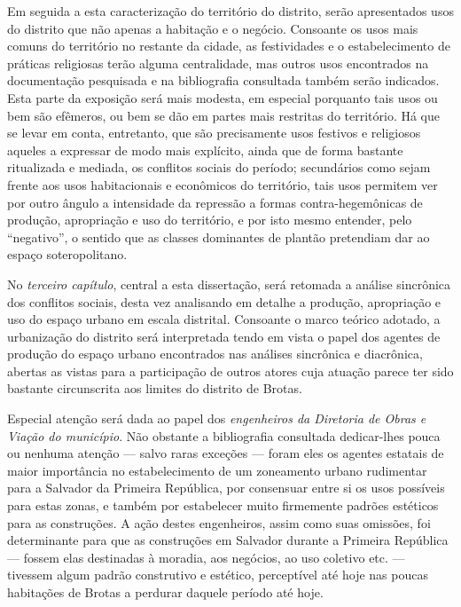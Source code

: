 Em seguida a esta caracterização do território do distrito, serão apresentados usos do distrito que não apenas a habitação e o negócio. Consoante os usos mais comuns do território no restante da cidade, as festividades e o estabelecimento de práticas religiosas terão alguma centralidade, mas outros usos encontrados na documentação pesquisada e na bibliografia consultada também serão indicados. Esta parte da exposição será mais modesta, em especial porquanto tais usos ou bem são efêmeros, ou bem se dão em partes mais restritas do território. Há que se levar em conta, entretanto, que são precisamente usos festivos e religiosos aqueles a expressar de modo mais explícito, ainda que de forma bastante ritualizada e mediada, os conflitos sociais do período; secundários como sejam frente aos usos habitacionais e econômicos do território, tais usos permitem ver por outro ângulo a intensidade da repressão a formas contra-hegemônicas de produção, apropriação e uso do território, e por isto mesmo entender, pelo ``negativo'', o sentido que as classes dominantes de plantão pretendiam dar ao espaço soteropolitano.

No \textit{terceiro capítulo}, central a esta dissertação, será retomada a análise sincrônica dos conflitos sociais, desta vez analisando em detalhe a produção, apropriação e uso do espaço urbano em escala distrital. Consoante o marco teórico adotado, a urbanização do distrito será interpretada tendo em vista o papel dos agentes de produção do espaço urbano encontrados nas análises sincrônica e diacrônica, abertas as vistas para a participação de outros atores cuja atuação parece ter sido bastante circunscrita aos limites do distrito de Brotas.

Especial atenção será dada ao papel dos \textit{engenheiros da Diretoria de Obras e Viação do município}. Não obstante a bibliografia consultada dedicar-lhes pouca ou nenhuma atenção --- salvo raras exceções \cite{almeida_victoria_1997, almeida_vitrinescomercio_2014, cardoso1990proleta, cardoso_vilas_1991} --- foram eles os agentes estatais de maior importância no estabelecimento de um zoneamento urbano rudimentar para a Salvador da Primeira República, por consensuar entre si os usos possíveis para estas zonas, e também por estabelecer muito firmemente padrões estéticos para as construções. A ação destes engenheiros, assim como suas omissões, foi determinante para que as construções em Salvador durante a Primeira República --- fossem elas destinadas à moradia, aos negócios, ao uso coletivo etc. --- tivessem algum padrão construtivo e estético, perceptível até hoje nas poucas habitações de Brotas a perdurar daquele período até hoje.

